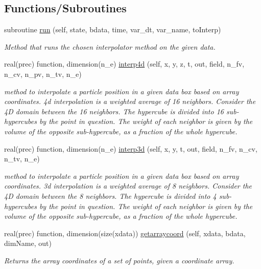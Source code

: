 \subsection*{Functions/\+Subroutines}
\begin{DoxyCompactItemize}
\item 
subroutine \mbox{\hyperlink{namespaceinterpolator__mod_aeb33b9e901668a304b49a9cc7e42969c}{run}} (self, state, bdata, time, var\+\_\+dt, var\+\_\+name, to\+Interp)
\begin{DoxyCompactList}\small\item\em Method that runs the chosen interpolator method on the given data. \end{DoxyCompactList}\item 
real(prec) function, dimension(n\+\_\+e) \mbox{\hyperlink{namespaceinterpolator__mod_a4d21fa0242d7cf7742a44d85314ec183}{interp4d}} (self, x, y, z, t, out, field, n\+\_\+fv, n\+\_\+cv, n\+\_\+pv, n\+\_\+tv, n\+\_\+e)
\begin{DoxyCompactList}\small\item\em method to interpolate a particle position in a given data box based on array coordinates. 4d interpolation is a weighted average of 16 neighbors. Consider the 4D domain between the 16 neighbors. The hypercube is divided into 16 sub-\/hypercubes by the point in question. The weight of each neighbor is given by the volume of the opposite sub-\/hypercube, as a fraction of the whole hypercube. \end{DoxyCompactList}\item 
real(prec) function, dimension(n\+\_\+e) \mbox{\hyperlink{namespaceinterpolator__mod_a15031a389a46159257dd4c2b15174a0b}{interp3d}} (self, x, y, t, out, field, n\+\_\+fv, n\+\_\+cv, n\+\_\+tv, n\+\_\+e)
\begin{DoxyCompactList}\small\item\em method to interpolate a particle position in a given data box based on array coordinates. 3d interpolation is a weighted average of 8 neighbors. Consider the 4D domain between the 8 neighbors. The hypercube is divided into 4 sub-\/hypercubes by the point in question. The weight of each neighbor is given by the volume of the opposite sub-\/hypercube, as a fraction of the whole hypercube. \end{DoxyCompactList}\item 
real(prec) function, dimension(size(xdata)) \mbox{\hyperlink{namespaceinterpolator__mod_aa0ec274fefa309bd1aea4b1b81ad43e1}{getarraycoord}} (self, xdata, bdata, dim\+Name, out)
\begin{DoxyCompactList}\small\item\em Returns the array coordinates of a set of points, given a coordinate array. \end{DoxyCompactList}\item 

\end{DoxyCompactItemize}
